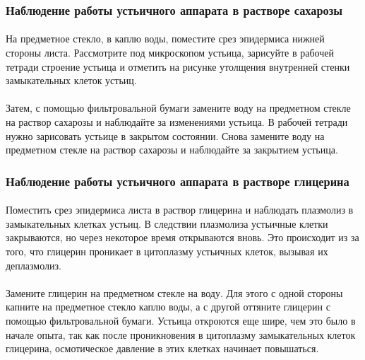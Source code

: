 \subsubsection*{Наблюдение работы устьичного аппарата в растворе сахарозы}

\paragraph*{}На предметное стекло, в каплю воды, поместите срез эпидермиса нижней стороны листа. Рассмотрите под микроскопом устьица, зарисуйте в рабочей тетради строение устьица и отметить на рисунке утолщения внутренней стенки замыкательных клеток устьиц. 

\paragraph*{}Затем, с помощью фильтровальной бумаги замените воду на предметном стекле на раствор сахарозы и наблюдайте за изменениями устьица. В рабочей тетради нужно зарисовать устьице в закрытом состоянии. Снова замените воду на предметном стекле на раствор сахарозы и наблюдайте за закрытием устьица.

\subsubsection*{Наблюдение работы устьичного аппарата в растворе глицерина}

\paragraph*{}Поместить срез эпидермиса листа в раствор глицерина и наблюдать плазмолиз в замыкательных клетках устьиц. В следствии плазмолиза устьичные клетки закрываются, но через некоторое время открываются вновь. Это происходит из за того, что глицерин проникает в цитоплазму устьичных клеток, вызывая их деплазмолиз.

\paragraph*{}Замените глицерин на предметном стекле на воду. Для этого с одной стороны капните на предметное стекло каплю воды, а с другой оттяните глицерин с помощью фильтровальной бумаги. Устьица откроются еще шире, чем это было в начале опыта, так как после проникновения в цитоплазму замыкательных клеток глицерина, осмотическое давление в этих клетках начинает повышаться.

